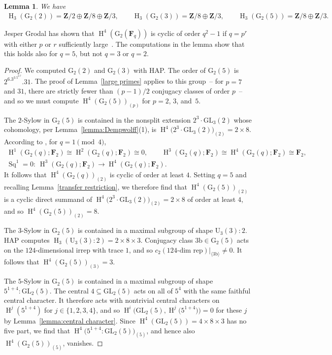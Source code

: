 \documentclass[pdftex]{sigma}
\numberwithin{equation}{section}
\newtheorem{Lemma}[Theorem]{Lemma}
\newcommand\bF{\mathbf F}
\newcommand\bZ{\mathbf Z}
\newcommand\rb{\mathrm b}
\newcommand\rG{\mathrm G}
\DeclareMathOperator\homology{H}
\renewcommand\H{\homology}
\newcommand\<\langle
\renewcommand\>\rangle
\DeclareMathOperator\Sq{Sq}
\newcommand{\GL}{\mathrm{GL}}
\begin{document}
\begin{Lemma}\label{lemma:g2q}We have
\begin{gather*}
\H_3(\mathrm{G}_2(2)) = \bZ/2 \oplus \bZ/8 \oplus \bZ/3, \!\qquad \H_3(\mathrm{G}_2(3)) = \bZ/8 \oplus \bZ/3, \!\qquad \H_3(\mathrm{G}_2(5)) = \bZ/8 \oplus \bZ/3.\!
\end{gather*}
\end{Lemma}
Jesper Grodal has shown that $\H^4(\mathrm{G}_2(\bF_q))$ is cyclic of order $q^2 -1$ if $q = p^r$ with either $p$ or $r$ sufficiently large~\cite{Grodal}. The computations in the lemma show that this holds also for $q = 5$, but not $q = 3$ or $q = 2$.

\begin{proof} We computed $\mathrm{G}_2(2)$ and $\mathrm{G}_2(3)$ with HAP.
The order of $\rG_2(5)$ is $2^6.3^3.5^6.7.31$. The proof of Lemma~\ref{large primes} applies to this group~-- for $p=7$ and $31$, there are strictly fewer than
 $(p-1)/2$ conjugacy classes of order $p$~-- and so we must compute $\H^4(\rG_2(5))_{(p)}$ for $p=2$, $3$, and~$5$.

The $2$-Sylow in $\rG_2(5)$ is contained in the nonsplit extension $2^3\cdot \GL_3(2)$ whose cohomology, per Lemma~\ref{lemma:Dempwolff}(1), is $\H^4\big(2^3\cdot \GL_3(2)\big)_{(2)} = 2 \times 8$. According to \cite{MR1603199}, for $q = 1 \pmod {4}$,
\begin{gather*}
 \H^1(\rG_2(q);\bF_2) \cong \H^2(\rG_2(q);\bF_2) \cong 0 ,\qquad \H^3(\rG_2(q);\bF_2) \cong \H^4(\rG_2(q);\bF_2) \cong \bF_2, \\
 \Sq^1 = 0\colon \ \H^3(\rG_2(q);\bF_2) \to \H^4(\rG_2(q);\bF_2).
\end{gather*}
It follows that $\H^4(\rG_2(q))_{(2)}$ is cyclic of order at least $4$.
Setting $q = 5$ and recalling Lemma~\ref{transfer restriction}, we therefore find that $\H^4(\rG_2(5))_{(2)}$ is a cyclic direct summand of $\H^4\big(2^3\cdot \GL_3(2)\big)_{(2)} = 2 \times 8$ of order at least $4$, and so $\H^4(\rG_2(5))_{(2)} = 8$.

The $3$-Sylow in $\rG_2(5)$ is contained in a maximal subgroup of shape $\mathrm{U}_3(3):2$. HAP computes $\H_3(\mathrm{U}_3(3):2) = 2 \times 8 \times 3$. Conjugacy class $3\rb \in \rG_2(5)$ acts on the $124$-dimensional irrep with trace $1$, and so $c_2(\text{124-dim rep})|_{\langle 3\rb\rangle} \neq 0$. It follows that $\H^4(\rG_2(5))_{(3)} = 3$.

The $5$-Sylow in $\rG_2(5)$ is contained in a maximal subgroup of shape $5^{1+4}:\mathrm{GL}_2(5)$. The central $4 \subseteq \mathrm{GL}_2(5)$ acts on all of $5^4$ with the same faithful central character. It therefore acts with nontrivial central characters on $\H^j(5^{1+4})$ for $j \in \{1,2,3,4\}$, and so $\H^i\big(\mathrm{GL}_2(5), \H^j\big(5^{1+4}\big)\big) = 0$ for these $j$ by Lemma~\ref{lemma:central character}. Since $\H^4(\mathrm{GL}_2(5)) = 4 \times 8 \times 3$ has no five part, we find that $\H^4\big(5^{1+4}:\mathrm{GL}_2(5)\big)_{(5)}$, and hence also $\H^4(\rG_2(5))_{(5)}$, vanishes.
\end{proof}
\end{document}
